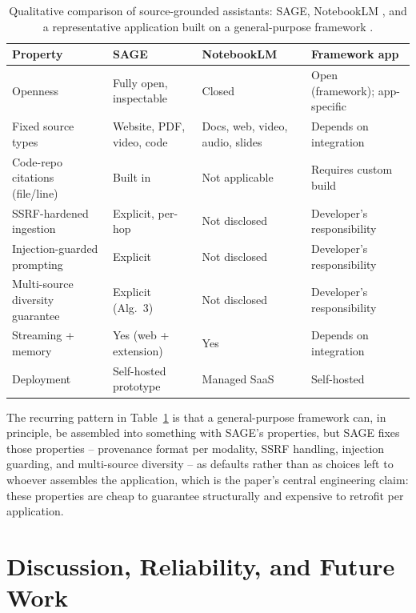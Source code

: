 \documentclass[conference]{IEEEtran}
\begin{document}
\begin{table}[t]
\caption{Qualitative comparison of source-grounded assistants: SAGE, NotebookLM \cite{notebooklm2026}, and a representative application built on a general-purpose framework \cite{langchain2026,llamaindex2026}.}
\label{tab:compare}
\centering
\begin{tabular}{p{1.7cm}p{1.6cm}p{1.6cm}p{1.6cm}}
\hline
\textbf{Property} & \textbf{SAGE} & \textbf{NotebookLM} & \textbf{Framework app} \\
\hline
Openness & Fully open, inspectable & Closed & Open (framework); app-specific \\
Fixed source types & Website, PDF, video, code & Docs, web, video, audio, slides & Depends on integration \\
Code-repo citations (file/line) & Built in & Not applicable & Requires custom build \\
SSRF-hardened ingestion & Explicit, per-hop & Not disclosed & Developer's responsibility \\
Injection-guarded prompting & Explicit & Not disclosed & Developer's responsibility \\
Multi-source diversity guarantee & Explicit (Alg.~3) & Not disclosed & Developer's responsibility \\
Streaming + memory & Yes (web + extension) & Yes & Depends on integration \\
Deployment & Self-hosted prototype & Managed SaaS & Self-hosted \\
\hline
\end{tabular}
\end{table}

The recurring pattern in Table~\ref{tab:compare} is that a general-purpose
framework can, in principle, be assembled into something with SAGE's
properties, but SAGE fixes those properties -- provenance format per
modality, SSRF handling, injection guarding, and multi-source diversity --
as defaults rather than as choices left to whoever assembles the
application, which is the paper's central engineering claim: these
properties are cheap to guarantee structurally and expensive to retrofit
per application.

\section{Discussion, Reliability, and Future Work}
\end{document}
